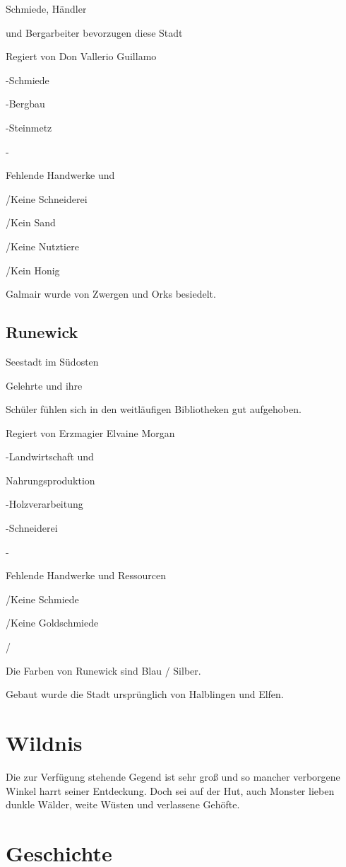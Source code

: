 \documentclass[a4paper,11pt]{book}
\begin{document}
Schmiede, Händler

und Bergarbeiter bevorzugen diese Stadt

Regiert von Don Vallerio Guillamo

-Schmiede

-Bergbau

-Steinmetz

-

Fehlende Handwerke und

/Keine Schneiderei

/Kein Sand

/Keine Nutztiere

/Kein Honig

Galmair wurde von Zwergen und Orks besiedelt.

\subsection{Runewick}

Seestadt im Südosten

Gelehrte und ihre

Schüler fühlen sich in den weitläufigen Bibliotheken gut aufgehoben.

Regiert von Erzmagier Elvaine Morgan

-Landwirtschaft und

Nahrungsproduktion

-Holzverarbeitung

-Schneiderei

-

Fehlende Handwerke und Ressourcen

/Keine Schmiede

/Keine Goldschmiede

/

Die Farben von Runewick sind Blau / Silber.

Gebaut wurde die Stadt ursprünglich von Halblingen und Elfen.

\section{Wildnis}

Die zur Verfügung stehende Gegend ist sehr groß und so mancher verborgene Winkel harrt seiner Entdeckung. Doch sei auf der Hut, auch Monster lieben dunkle Wälder, weite Wüsten und verlassene Gehöfte.

\section{Geschichte}
\end{document}

